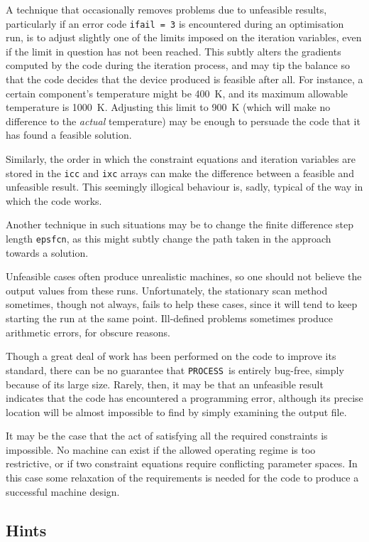 \documentclass[11pt,a4paper]{report}
\newcommand{\process}{\mbox{\texttt{PROCESS}}}
\begin{document}
A technique that occasionally removes problems due to unfeasible results,
particularly if an error code \texttt{ifail = 3} is encountered during an
optimisation run, is to adjust slightly one of the limits imposed on the
iteration variables, even if the limit in question has not been reached. This
subtly alters the gradients computed by the code during the iteration process,
and may tip the balance so that the code decides that the device produced is
feasible after all. For instance, a certain component's temperature might be
400~K, and its maximum allowable temperature is 1000~K\@. Adjusting this limit
to 900~K (which will make no difference to the \textit{actual}\/ temperature)
may be enough to persuade the code that it has found a feasible solution.

Similarly, the order in which the constraint equations and iteration variables
are stored in the \texttt{icc} and \texttt{ixc} arrays can make the difference
between a feasible and unfeasible result. This seemingly illogical behaviour
is, sadly, typical of the way in which the code works.

Another technique in such situations may be to change the finite difference
step length \texttt{epsfcn}, as this might subtly change the path taken in the
approach towards a solution.

Unfeasible cases often produce unrealistic machines, so one should not believe
the output values from these runs. Unfortunately, the stationary scan method
sometimes, though not always, fails to help these cases, since it will tend to
keep starting the run at the same point. Ill-defined problems sometimes
produce arithmetic errors, for obscure reasons.

Though a great deal of work has been performed on the code to improve its
standard, there can be no guarantee that \process\ is entirely bug-free,
simply because of its large size. Rarely, then, it may be that an unfeasible
result indicates that the code has encountered a programming error, although
its precise location will be almost impossible to find by simply examining the
output file.

It may be the case that the act of satisfying all the required constraints is
impossible. No machine can exist if the allowed operating regime is too
restrictive, or if two constraint equations require conflicting parameter
spaces. In this case some relaxation of the requirements is needed for the
code to produce a successful machine design.

\subsection{Hints}
\end{document}
